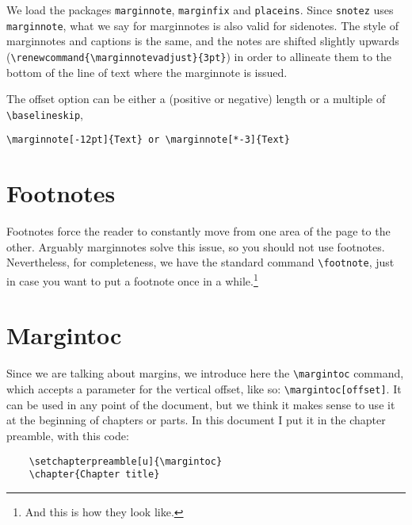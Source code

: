 We load the packages \verb|marginnote|, \verb|marginfix| and 
\verb|placeins|. Since \verb|snotez| uses \verb|marginnote|, what we say 
for marginnotes is also valid for sidenotes. The style of marginnotes 
and captions is the same, and the notes are shifted slightly upwards 
(\verb|\renewcommand{\marginnotevadjust}{3pt}|) in order to allineate 
them to the bottom of the line of text where the marginnote is issued.

The offset option can be either a (positive or negative) length or a 
multiple of \verb|\baselineskip|, \eg
\begin{verbatim}
\marginnote[-12pt]{Text} or \marginnote[*-3]{Text}
\end{verbatim}

\section{Footnotes}

Footnotes force the reader to constantly move from one area of the page 
to the other. Arguably marginnotes solve this issue, so you should not 
use footnotes. Nevertheless, for completeness, we have the standard 
command \verb|\footnote|, just in case you want to put a footnote once 
in a while.\footnote{And this is how they look like.}

\section{Margintoc}

Since we are talking about margins, we introduce here the 
\verb|\margintoc| command, which accepts a parameter for the vertical 
offset, like so: \verb|\margintoc[offset]|. It can be used in any point 
of the document, but we think it makes sense to use it at the beginning 
of chapters or parts. In this document I put it in the chapter preamble, 
with this code:


\begin{verbatim}
	\setchapterpreamble[u]{\margintoc}
	\chapter{Chapter title}
\end{verbatim}
